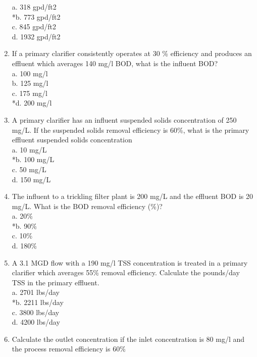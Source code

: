 \documentclass{article}
\begin{document}
\begin{enumerate}
a. 318 gpd/ft2 \\
*b. 773 gpd/ft2 \\
c. 845 gpd/ft2 \\
d. 1932 gpd/ft2 \\

\item  If a primary clarifier consistently operates at 30 \% efficiency and produces an effluent which averages 140 mg/l BOD, what is the influent BOD? \\

a. 100 mg/l \\
b. 125 mg/l \\
c. 175 mg/l \\
*d. 200 mg/l \\

\item  A primary clarifier has an influent suspended solids concentration of 250 mg/L. If the suspended solids removal efficiency is 60\%, what is the primary effluent suspended solids concentration \\

a. 10 mg/L \\
*b. 100 mg/L \\
c. 50 mg/L \\
d. 150 mg/L \\

\item  The influent to a trickling filter plant is 200 mg/L and the effluent BOD is 20 mg/L. What is the BOD removal efficiency (\%)? \\

a. 20\% \\
*b. 90\% \\
c. 10\% \\
d. 180\% \\

\item A 3.1 MGD flow with a 190 mg/l TSS concentration is treated in a primary clarifier which averages 55\% removal efficiency. Calculate the pounds/day TSS in the primary effluent. \\

a. 2701 lbs/day \\
*b. 2211 lbs/day \\
c. 3800 lbs/day \\
d. 4200 lbs/day \\



\item Calculate the outlet concentration if the inlet concentration is 80 mg/l and the process removal efficiency is 60\% \\


\end{enumerate}
\end{document}
